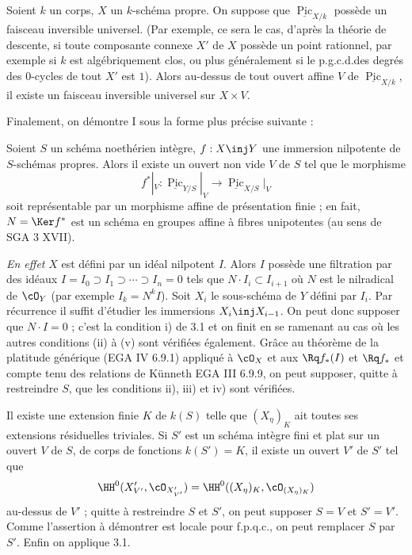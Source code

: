 \begin{cor}\label{cor:3.4} Soient $k$ un corps, $X$ un $k$-schéma propre. On suppose que $\underline{\operatorname{Pic}}_{X/k}$ possède un faisceau inversible universel. \textup{(}Par exemple, ce sera le cas, d'après la théorie de descente, si toute composante connexe $X'$ de $X$ possède un point rationnel, par exemple si $k$ est algébriquement clos, ou plus généralement si le p.g.c.d.\@ des degrés des $0$-cycles de tout $X'$ est $1$\textup{)}. Alors au-dessus de tout ouvert affine $V$ de $\underline{\operatorname{Pic}}_{X/k}$, il existe un faisceau inversible universel sur $X \times V$.
\end{cor}

\noindent
Finalement, on démontre I sous la forme plus précise suivante :

\begin{prop}\label{prop:3.5} Soient $S$ un schéma noethérien intègre, $f : X \inj Y$ une immersion nilpotente de $S$-schémas propres. Alors il existe un ouvert non vide $V$ de $S$ tel que le morphisme
\[
f^*|_V : \underline{\operatorname{Pic}}_{Y/S}|_V \to \underline{\operatorname{Pic}}_{X/S}|_V
\]
soit représentable par un morphisme affine de présentation finie ; en fait, $N = \Ker f^*$ est un schéma en groupes affine à fibres unipotentes (au sens de SGA 3 XVII).
\end{prop}

\noindent\textit{En effet} $X$ est défini par un idéal nilpotent $I$. Alors $I$ possède une filtration par des idéaux $I = I_0 \supset I_1 \supset \cdots \supset I_n = 0$ tels que $N \cdot I_i \subset I_{i+1}$ où $N$ est le nilradical de $\cO_Y$ (par exemple $I_k = N^k I$). Soit $X_i$ le sous-schéma de $Y$ défini par $I_i$. Par récurrence il suffit d'étudier les immersions $X_i \inj X_{i-1}$. On peut donc supposer que $N \cdot I = 0$ ; c'est la condition i) de 3.1 et on finit en se ramenant au cas où les autres conditions (ii) à (v) sont vérifiées également. Grâce au théorème de la platitude générique (EGA IV 6.9.1) appliqué à $\cO_X$ et aux $\Rq f_*(I)$ et $\Rq f_*$ et compte tenu des relations de Künneth EGA III 6.9.9, on peut supposer, quitte à restreindre $S$, que les conditions ii), iii) et iv) sont vérifiées.

Il existe une extension finie $K$ de $k(S)$ telle que $(X_{\eta})_K$ ait toutes ses extensions résiduelles triviales. Si $S'$ est un schéma intègre fini et plat sur un ouvert $V$ de $S$, de corps de fonctions $k(S') = K$, il existe un ouvert $V'$ de $S'$ tel que
\[
\HH^0(X'_{V'}, \cO_{X'_{V'}}) = \HH^0((X_{\eta})_K, \cO_{(X_{\eta})_K})
\]
au-dessus de $V'$ ; quitte à restreindre $S$ et $S'$, on peut supposer $S = V$ et $S' = V'$. Comme l'assertion à démontrer est locale pour f.p.q.c., on peut remplacer $S$ par $S'$. Enfin on applique 3.1.

